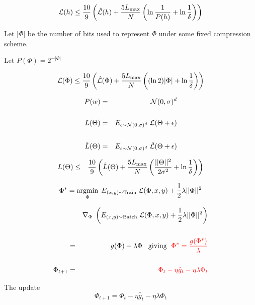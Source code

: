 {\vfill
    $${\cal L}(h) \leq \frac{10}{9}\left(\hat{\cal L}(h) + \frac{5 L_\mathrm{max}}{N}\left(\ln\frac{1}{P(h)} + \ln\frac{1}{\delta}\right)\right)$$


Let $|\Phi|$ be the number of bits used to represent $\Phi$ under some fixed compression scheme.

\vfill
Let $P(\Phi) = 2^{-|\Phi|}$

\vfill
    $${\cal L}(\Phi) \leq \frac{10}{9}\left(\hat{\cal L}(\Phi) + \frac{5 L_\mathrm{max}}{N}\left((\ln 2)|\Phi| + \ln\frac{1}{\delta}\right)\right)$$


\vfill
\begin{eqnarray*}
P(w) & = & {\cal N}(0,\sigma)^d \\
  \\
L(\Theta) & = & E_{\epsilon \sim {\cal N}(0,\sigma)^d}\;{\cal L}(\Theta+\epsilon) \\
\\
\hat{L}(\Theta) & = & E_{\epsilon \sim {\cal N}(0,\sigma)^d}\;\hat{{\cal L}}(\Theta+\epsilon)
\end{eqnarray*}

\vfill
\begin{eqnarray*}
   L(\Theta) & \leq & \frac{10}{9}\left(\hat{L}(\Theta) + \frac{5 L_{\max}}{N}\left(\frac{||\Theta||^2}{2\sigma^2} + \ln \frac{1}{\delta}\right)\right)
\end{eqnarray*}


$$\Phi^* = \operatorname*{argmin}_\Phi \;E_{(x,y) \sim \mathrm{Train}}\;{\cal L}(\Phi,x,y) + \frac{1}{2}\lambda||\Phi||^2$$

\vfill
\begin{eqnarray*}
  & & \nabla_\Phi \;\left(E_{(x,y) \sim \mathrm{Batch}}\;{\cal L}(\Phi,x,y) + \frac{1}{2}\lambda||\Phi||^2\right) \\
  \\
  & = & g(\Phi) + \lambda \Phi \;\;\;\mbox{giving }\;{\color{red} \Phi^* = \frac{g(\Phi^*)}{\lambda}} \\
  \\
  \Phi_{t+1} & = & {\color{red} \Phi_t - \eta \hat{g}_t - \eta \lambda \Phi_t}
\end{eqnarray*}


The update
$$\Phi_{t+1} = \Phi_t - \eta \hat{g}_t - \eta \lambda \Phi_t$$

}

